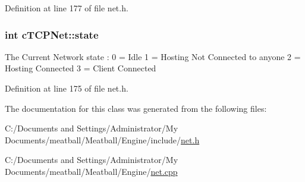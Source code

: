 Definition at line 177 of file net.\-h.

\hypertarget{classc_t_c_p_net_a07e6aa8d2af28f80aeefcce1b7c416c3}{
\subsubsection[{state}]{\setlength{\rightskip}{0pt plus 5cm}int c\-T\-C\-P\-Net\-::state}}\label{classc_t_c_p_net_a07e6aa8d2af28f80aeefcce1b7c416c3}
The Current Network state \-: 0 = Idle 1 = Hosting Not Connected to anyone 2 = Hosting Connected 3 = Client Connected 

Definition at line 175 of file net.\-h.



The documentation for this class was generated from the following files\-:\begin{DoxyCompactItemize}
\item 
C\-:/\-Documents and Settings/\-Administrator/\-My Documents/meatball/\-Meatball/\-Engine/include/\hyperlink{net_8h}{net.\-h}\item 
C\-:/\-Documents and Settings/\-Administrator/\-My Documents/meatball/\-Meatball/\-Engine/\hyperlink{net_8cpp}{net.\-cpp}\end{DoxyCompactItemize}
